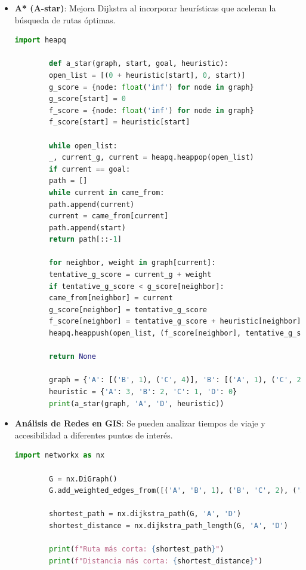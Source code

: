 \documentclass{article}
\begin{document}
{\begin{itemize}
\begin{lstlisting}[language=Python]
		graph = {'A': [('B', 1), ('C', 4)], 'B': [('A', 1), ('C', 2), ('D', 5)], 'C': [('A', 4), ('B', 2), ('D', 1)], 'D': [('B', 5), ('C', 1)]}
		print(dijkstra(graph, 'A'))
	\end{lstlisting}
	
	\item \textbf{A* (A-star)}: Mejora Dijkstra al incorporar heurísticas que aceleran la búsqueda de rutas óptimas.
	\begin{lstlisting}[language=Python]
		import heapq
		
		def a_star(graph, start, goal, heuristic):
		open_list = [(0 + heuristic[start], 0, start)]
		g_score = {node: float('inf') for node in graph}
		g_score[start] = 0
		f_score = {node: float('inf') for node in graph}
		f_score[start] = heuristic[start]
		
		while open_list:
		_, current_g, current = heapq.heappop(open_list)
		if current == goal:
		path = []
		while current in came_from:
		path.append(current)
		current = came_from[current]
		path.append(start)
		return path[::-1]
		
		for neighbor, weight in graph[current]:
		tentative_g_score = current_g + weight
		if tentative_g_score < g_score[neighbor]:
		came_from[neighbor] = current
		g_score[neighbor] = tentative_g_score
		f_score[neighbor] = tentative_g_score + heuristic[neighbor]
		heapq.heappush(open_list, (f_score[neighbor], tentative_g_score, neighbor))
		
		return None
		
		graph = {'A': [('B', 1), ('C', 4)], 'B': [('A', 1), ('C', 2), ('D', 5)], 'C': [('A', 4), ('B', 2), ('D', 1)], 'D': [('B', 5), ('C', 1)]}
		heuristic = {'A': 3, 'B': 2, 'C': 1, 'D': 0}
		print(a_star(graph, 'A', 'D', heuristic))
	\end{lstlisting}
	
	\item \textbf{Análisis de Redes en GIS}: Se pueden analizar tiempos de viaje y accesibilidad a diferentes puntos de interés.
	\begin{lstlisting}[language=Python]
		import networkx as nx
		
		G = nx.DiGraph()
		G.add_weighted_edges_from([('A', 'B', 1), ('B', 'C', 2), ('A', 'C', 4), ('C', 'D', 1)])
		
		shortest_path = nx.dijkstra_path(G, 'A', 'D')
		shortest_distance = nx.dijkstra_path_length(G, 'A', 'D')
		
		print(f"Ruta más corta: {shortest_path}")
		print(f"Distancia más corta: {shortest_distance}")
	\end{lstlisting}
\end{itemize}


}
\end{document}
